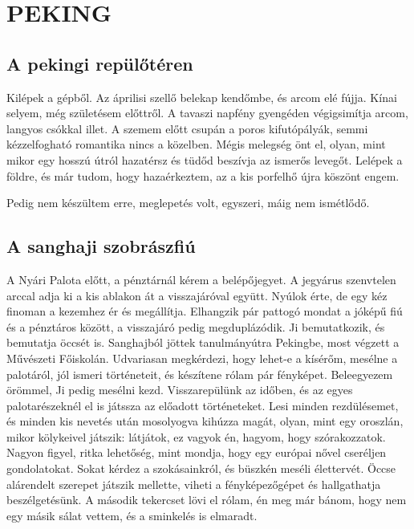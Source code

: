 \clearpage
\chapter{PEKING}

\section{A pekingi repülőtéren}

Kilépek a gépből. Az áprilisi szellő belekap kendőmbe, és arcom elé
fújja. Kínai selyem, még születésem előttről. A tavaszi napfény gyengéden
végigsimítja arcom, langyos csókkal illet. A szemem előtt csupán a
poros kifutópályák, semmi kézzelfogható romantika nincs a közelben.
Mégis melegség önt el, olyan, mint mikor egy hosszú útról hazatérsz
és tüdőd beszívja az ismerős levegőt. Lelépek a földre, és már tudom,
hogy hazaérkeztem, az a kis porfelhő újra köszönt engem.

Pedig nem készültem erre, meglepetés volt, egyszeri, máig nem ismétlődő.

\section{A sanghaji szobrászfiú}

A Nyári Palota előtt, a pénztárnál kérem a belépőjegyet. A jegyárus
szenvtelen arccal adja ki a kis ablakon át a visszajáróval együtt. Nyúlok
érte, de egy kéz finoman a kezemhez ér és megállítja. Elhangzik pár pattogó
mondat a jóképű fiú és a pénztáros között, a visszajáró pedig megduplázódik.
Ji bemutatkozik, és bemutatja öccsét is. Sanghajból jöttek tanulmányútra
Pekingbe, most végzett a Művészeti Főiskolán. Udvariasan megkérdezi,
hogy lehet-e a kísérőm, mesélne a palotáról, jól ismeri történeteit, és
készítene rólam pár fényképet. Beleegyezem örömmel, Ji pedig mesélni kezd.
Visszarepülünk az időben, és az egyes palotarészeknél el is játssza az
előadott történeteket. Lesi minden rezdülésemet, és minden kis nevetés után
mosolyogva kihúzza magát, olyan, mint egy oroszlán, mikor kölykeivel játszik:
látjátok, ez vagyok én, hagyom, hogy szórakozzatok. Nagyon figyel,
ritka lehetőség, mint mondja, hogy egy európai nővel cseréljen gondolatokat.
Sokat kérdez a szokásainkról, és büszkén meséli élettervét. Öccse alárendelt
szerepet játszik mellette, viheti a fényképezőgépet és hallgathatja
beszélgetésünk. A második tekercset lövi el rólam, én meg már bánom,
hogy nem egy másik sálat vettem, és a sminkelés is elmaradt.

